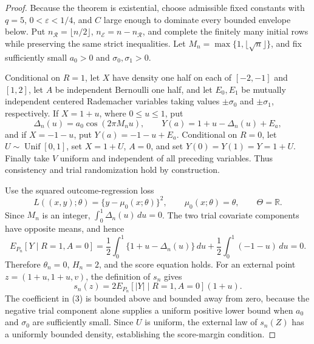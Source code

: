 \documentclass{article}
\begin{document}
\begin{proof}
Because the theorem is existential, choose admissible fixed constants with \(q=5\), \(0<\varepsilon<1/4\), and \(C\) large enough to dominate every bounded envelope below.  Put \(n_{\mathcal R}=\lfloor n/2\rfloor\), \(n_{\mathcal E}=n-n_{\mathcal R}\), and complete the finitely many initial rows while preserving the same strict inequalities.  Let \(M_n=\max\{1,\lfloor\sqrt n\rfloor\}\), and fix sufficiently small \(a_0>0\) and \(\sigma_0,\sigma_1>0\).

Conditional on \(R=1\), let \(X\) have density one half on each of \([-2,-1]\) and \([1,2]\), let \(A\) be independent Bernoulli one half, and let \(E_0,E_1\) be mutually independent centered Rademacher variables taking values \(\pm\sigma_0\) and \(\pm\sigma_1\), respectively.  If \(X=1+u\), where \(0\leq u\leq1\), put
\[
 \Delta_n(u)=a_0\cos(2\pi M_nu),
 \qquad
 Y(a)=1+u-\Delta_n(u)+E_a,
\tag{1}
\]
and if \(X=-1-u\), put \(Y(a)=-1-u+E_a\).  Conditional on \(R=0\), let \(U\sim\operatorname{Unif}[0,1]\), set \(X=1+U\), \(A=0\), and set \(Y(0)=Y(1)=Y=1+U\).  Finally take \(V\) uniform and independent of all preceding variables.  Thus consistency and trial randomization hold by construction.

Use the squared outcome-regression loss
\[
 L((x,y);\theta)=\{y-\mu_0(x;\theta)\}^2,
 \qquad \mu_0(x;\theta)=\theta,
 \qquad \Theta=\mathbb R.
\tag{2}
\]
Since \(M_n\) is an integer, \(\int_0^1\Delta_n(u)\,du=0\).  The two trial covariate components have opposite means, and hence
\[
 E_{P_n}[Y\mid R=1,A=0]
 =\frac12\int_0^1\{1+u-\Delta_n(u)\}\,du
  +\frac12\int_0^1(-1-u)\,du=0.
\]
Therefore \(\theta_n=0\), \(H_n=2\), and the score equation holds.  For an external point \(z=(1+u,1+u,v)\), the definition of \(s_n\) gives
\[
 s_n(z)=2E_{P_n}[|Y|\mid R=1,A=0](1+u).
\tag{3}
\]
The coefficient in (3) is bounded above and bounded away from zero, because the negative trial component alone supplies a uniform positive lower bound when \(a_0\) and \(\sigma_0\) are sufficiently small.  Since \(U\) is uniform, the external law of \(s_n(Z)\) has a uniformly bounded density, establishing the score-margin condition.


\end{proof}
\end{document}
